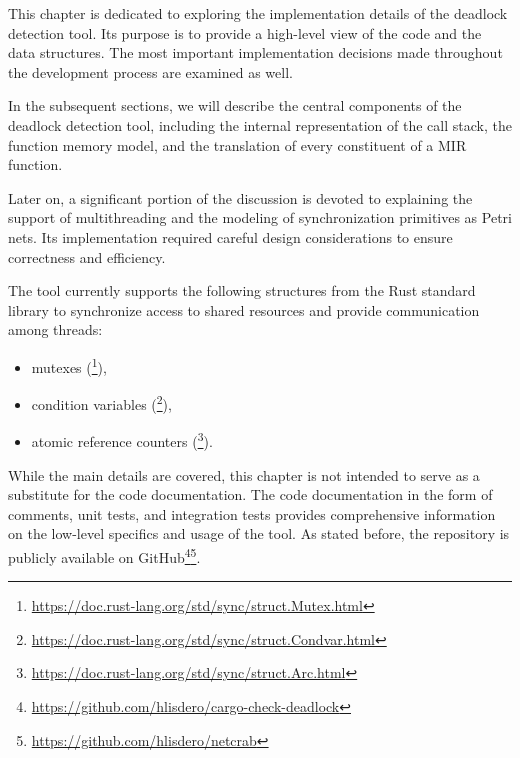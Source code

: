 This chapter is dedicated to exploring
the implementation details of the deadlock detection tool.
Its purpose is to provide a high-level view of the code and the data structures.
The most important implementation decisions made throughout the development process
are examined as well.

In the subsequent sections,
we will describe the central components of the deadlock detection tool,
including the internal representation of the call stack, the function memory model,
and the translation of every constituent of a \acrshort{MIR} function.

Later on, a significant portion of the discussion is devoted to explaining
the support of multithreading and the modeling of synchronization primitives as Petri nets.
Its implementation required careful design considerations
to ensure correctness and efficiency.

The tool currently supports the following structures
from the Rust standard library to synchronize access to shared resources
and provide communication among threads:

\begin{itemize}
  \item mutexes (\footnote{\url{https://doc.rust-lang.org/std/sync/struct.Mutex.html}}),
  \item condition variables (\footnote{\url{https://doc.rust-lang.org/std/sync/struct.Condvar.html}}),
  \item atomic reference counters (\footnote{\url{https://doc.rust-lang.org/std/sync/struct.Arc.html}}).
\end{itemize}

While the main details are covered, this chapter is not intended
to serve as a substitute for the code documentation.
The code documentation in the form of comments, unit tests, and integration tests
provides comprehensive information on the low-level specifics and usage of the tool.
As stated before, the repository is publicly available on
GitHub\footnote{\url{https://github.com/hlisdero/cargo-check-deadlock}}\footnote{\url{https://github.com/hlisdero/netcrab}}.